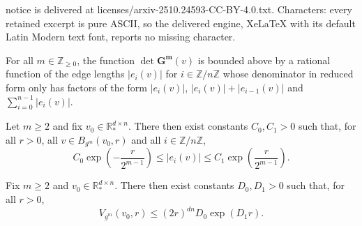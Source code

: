 \documentclass[10pt,a4paper]{amsart}
\newcommand{\R}{\mathbb{R}}
\newcommand{\Z}{\mathbb{Z}}
\begin{document}
notice is delivered at licenses/arxiv-2510.24593-CC-BY-4.0.txt. Characters: every retained excerpt is pure ASCII, so the delivered engine, XeLaTeX with its default Latin Modern text font, reports no missing character.
\begin{lemma}\label{lem:volume_control_via_edges}
    For all $m\in\Z_{\geq 0}$, the function $\det\mathbf{G^m}(v)$ is bounded above by a rational function of the edge lengths $|e_i(v)|$ for $i\in \Z/n\Z$ whose denominator in reduced form only has factors of the form $|e_i(v)|$, $|e_i(v)|+|e_{i-1}(v)|$ and $\sum_{i=0}^{n-1}|e_i(v)|$.
\end{lemma}

\begin{lemma}\label{lem:edge_growth}
    Let $m\geq 2$ and fix $v_0\in \R^{d\times n}_*$. There then exist constants $C_0,C_1>0$ such that, for all $r>0$, all $v\in B_{g^m}(v_0,r)$ and all $i\in \Z/n\Z$,
    \begin{displaymath}
        C_0\exp\left(-\frac{r}{2^{m-1}}\right)
        \leq |e_i(v)|
        \leq C_1\exp\left(\frac{r}{2^{m-1}}\right).
    \end{displaymath}
\end{lemma}

\begin{proposition}\label{propn:growthcontrol}
    Fix $m\geq 2$ and $v_0\in \R^{d\times n}_*$. There then exist constants $D_0,D_1>0$ such that, for all $r>0$,
    \begin{displaymath}
        V_{g^m}(v_0,r)\leq \left(2r\right)^{dn}D_0\exp\left(D_1 r\right).
    \end{displaymath}
\end{proposition}
\end{document}

